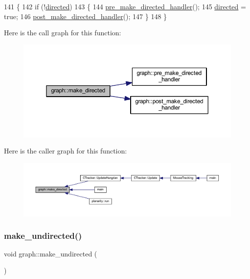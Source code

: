 \begin{DoxyCode}
141 \{
142     \textcolor{keywordflow}{if} (!\mbox{\hyperlink{classgraph_ab4120df210eb3d03d20b0bd27f8cbe8c}{directed}})
143     \{
144     \mbox{\hyperlink{classgraph_a505198f412b1e426e9d09b62ea9811e8}{pre\_make\_directed\_handler}}();
145     \mbox{\hyperlink{classgraph_ab4120df210eb3d03d20b0bd27f8cbe8c}{directed}} = \textcolor{keyword}{true};
146     \mbox{\hyperlink{classgraph_a43dc35def3d8125eb8f3841d55e0b1c8}{post\_make\_directed\_handler}}();
147     \}
148 \}
\end{DoxyCode}
Here is the call graph for this function\+:
\nopagebreak
\begin{figure}[H]
\begin{center}
\leavevmode
\includegraphics[width=350pt]{classgraph_a1615678dee6248d6d8a00c553770b3bd_cgraph}
\end{center}
\end{figure}
Here is the caller graph for this function\+:
\nopagebreak
\begin{figure}[H]
\begin{center}
\leavevmode
\includegraphics[width=350pt]{classgraph_a1615678dee6248d6d8a00c553770b3bd_icgraph}
\end{center}
\end{figure}
\mbox{\label{classgraph_a31c8b895bd842f1b9dcc67649956cfc7}} 
\subsubsection{\texorpdfstring{make\+\_\+undirected()}{make\_undirected()}}
{\footnotesize\ttfamily void graph\+::make\+\_\+undirected (\begin{DoxyParamCaption}{ }\end{DoxyParamCaption})\hspace{0.3cm}{\ttfamily [inherited]}}

